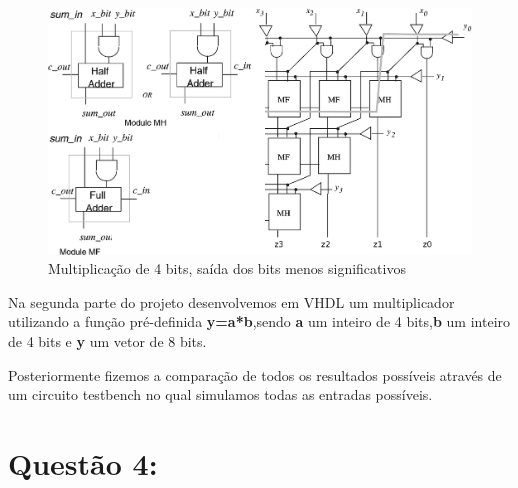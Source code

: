 \documentclass[10pt, letterpaper]{article}
\numberwithin{table}{section}
\numberwithin{figure}{section}
\begin{document}
\begin{figure}[h!]
\begin{centering}
\includegraphics[scale=0.7]{q3a.eps}
\par\end{centering}
\caption{Multiplicação de 4 bits, saída dos bits menos significativos}
\end{figure}
 
Na segunda parte do projeto desenvolvemos em VHDL um multiplicador utilizando a função pré-definida {\bf y=a*b},sendo {\bf a} um inteiro de 4 bits,{\bf b} um inteiro de 4 bits e {\bf y} um vetor de 8 bits.

Posteriormente fizemos a comparação de todos os resultados possíveis através de um circuito testbench no qual simulamos todas as entradas possíveis. 
\newpage





\newpage
{}


\newpage
{}



\newpage
\section{Quest\~ao 4:}


\hspace{0.5cm}
\end{document}
